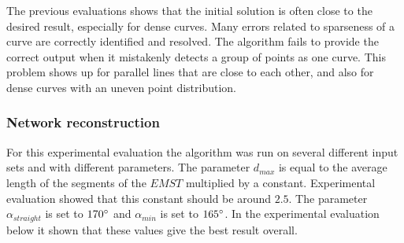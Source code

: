 \documentclass[11pt]{article}
\begin{document}
The previous evaluations shows that the initial solution is often close to the desired result, especially for dense curves. Many errors related to sparseness of a curve are correctly identified and resolved. The algorithm fails to provide the correct output when it mistakenly detects a group of points as one curve. This problem shows up for parallel lines that are close to each other, and also for dense curves with an uneven point distribution.

\subsubsection{Network reconstruction}
For this experimental evaluation the algorithm was run on several different input sets and with different parameters. The parameter $d_{max}$ is equal to the average length of the segments of the $EMST$ multiplied by a constant. Experimental evaluation showed that this constant should be around $2.5$. The parameter $\alpha_{straight}$ is set to $170\degree$ and $\alpha_{min}$ is set to $165\degree$. In the experimental evaluation below it shown that these values give the best result overall.
\end{document}
